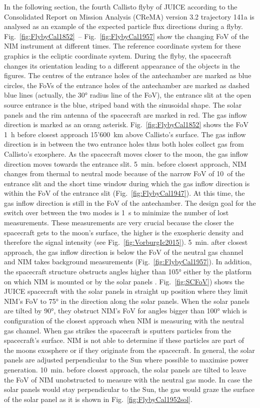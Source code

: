	In the following section, the fourth Callisto flyby of JUICE according to the Consolidated Report on Mission Analysis (CReMA) version 3.2 trajectory 141a \cite{SOC_Crema3p2} is analysed as an example of the expected particle flux directions during a flyby. Fig.~\ref{fig:FlybyCal1852}~-- Fig.~\ref{fig:FlybyCal1957} show the changing FoV of the NIM instrument at different times. The reference coordinate system for these graphics is the ecliptic coordinate system. During the flyby, the spacecraft changes its orientation leading to a different appearance of the objects in the figures. The centres of the entrance holes of the antechamber are marked as blue circles, the FoVs of the entrance holes of the antechamber are marked as dashed blue lines (actually, the 30° radius line of the FoV), the entrance slit at the open source entrance is the blue, striped band with the sinusoidal shape. The solar panels and the rim antenna of the spacecraft are marked in red. The gas inflow direction is marked as an orang asterisk. Fig.~\ref{fig:FlybyCal1852} shows the FoV 1~h before closest approach 15'600~km above Callisto's surface. The gas inflow direction is in between the two entrance holes thus both holes collect gas from Callisto's exosphere. As the spacecraft moves closer to the moon, the gas inflow direction moves towards the entrance slit. 5~min. before closest approach, NIM changes from thermal to neutral mode because of the narrow FoV of 10\degree~of the entrance slit and the short time window during which the gas inflow direction is within the FoV of the entrance slit (Fig.~\ref{fig:FlybyCal1947}). At this time, the gas inflow direction is still in the FoV of the antechamber. The design goal for the switch over between the two modes is 1~s to minimize the number of lost measurements. These measurements are very crucial because the closer the spacecraft gets to the moon's surface, the higher is the exospheric density and therefore the signal intensity (see Fig.~\ref{fig:VorburgIc2015}). 5~min. after closest approach, the gas inflow direction is below the FoV of the neutral gas channel and NIM takes background measurements (Fig.~\ref{fig:FlybyCal1957}). In addition, the spacecraft structure obstructs angles higher than 105° either by the platform on which NIM is mounted or by the solar panels \cite{NIM_FoV}. Fig.~\ref{fig:SCFoV}) shows the JUICE spacecraft with the solar panels in straight up position where they limit NIM's FoV to 75° in the direction along the solar panels. When the solar panels are tilted by 90°, they obstruct NIM's FoV for angles bigger than 100° which is configuration of the closest approach when NIM is measuring with the neutral gas channel. When gas strikes the spacecraft is sputters particles from the spacecraft's surface. NIM is not able to determine if these particles are part of the moons exosphere or if they originate from the spacecraft. In general, the solar panels are adjusted perpendicular to the Sun where possible to maximise power generation. 10~min. before closest approach, the solar panels are tilted to leave the FoV of NIM unobstructed to measure with the neutral gas mode. In case the solar panels would stay perpendicular to the Sun, the gas would graze the surface of the solar panel as it is shown in Fig.~\ref{fig:FlybyCal1952sol}. 